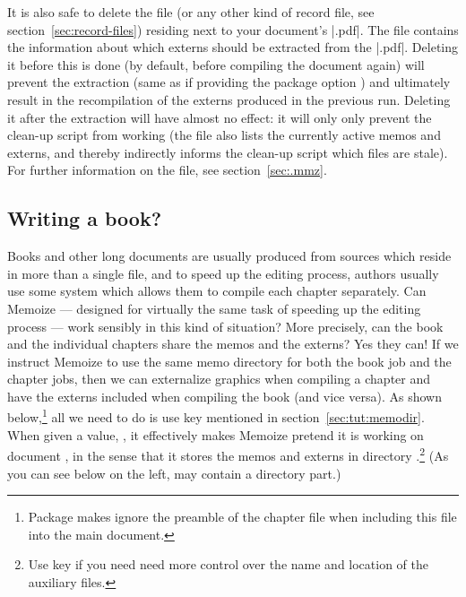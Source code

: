 \documentclass[a4paper,11pt]{article}
\begin{document}
It is also safe to delete the \dmmz file (or any other kind of record file, see
section~\ref{sec:record-files}) residing next to your document's |.pdf|.  The
\dmmz file contains the information about which externs should be extracted
from the |.pdf|.  Deleting it before this is done (by default, before compiling
the document again) will prevent the extraction (same as if providing the
package option ) and ultimately
result in the recompilation of the externs produced in the previous run.
Deleting it after the extraction will have almost no effect: it will only only
prevent the clean-up script from working (the \dmmz file also lists the
currently active memos and externs, and thereby indirectly informs the clean-up
script which files are stale).  For further information on the \dmmz file, see
section~\ref{sec:.mmz}.



\subsection{Writing a book?}
\label{sec:tut:multifile}

Books and other long documents are usually produced from sources which reside
in more than a single file, and to speed up the editing process, authors
usually use some system which allows them to compile each chapter separately.
Can Memoize --- designed for virtually the same task of speeding up the editing
process --- work sensibly in this kind of situation?  More precisely, can the
book and the individual chapters share the memos and the externs?  Yes they
can!  If we instruct Memoize to use the same memo directory for both the book
job and the chapter jobs, then we can externalize graphics when compiling a
chapter and have the externs included when compiling the book (and vice versa).
As shown below,\footnote{Package  makes  ignore the
  preamble of the chapter file when including this file into the main
  document.} all we need to do is use key  mentioned in
section~\ref{sec:tut:memodir}.  When given a value, , it effectively makes Memoize pretend it is working on
document , in the sense that it stores the memos and
externs in directory .\footnote{Use key
   if you need need more control over the name and location of
  the auxiliary files.}  (As you can see below on the left,  may
contain a directory part.)
\end{document}
